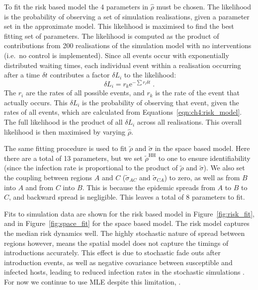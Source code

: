 To fit the risk based model the 4 parameters in $\hat{\rho}$ must be chosen. The likelihood is the probability of observing a set of simulation realisations, given a parameter set in the approximate model. This likelihood is maximised to find the best fitting set of parameters. The likelihood is computed as the product of contributions from 200 realisations of the simulation model with no interventions (i.e.\ no control is implemented). Since all events occur with exponentially distributed waiting times, each individual event within a realisation occurring after a time $\delta{}t$ contributes a factor $\delta{}L_i$ to the likelihood:
\begin{equation}
\delta{}L_i = r_k\mathrm{e}^{-\sum{}r_i\delta{}t}\;.
\end{equation}
The $r_i$ are the rates of all possible events, and $r_k$ is the rate of the event that actually occurs. This $\delta{}L_i$ is the probability of observing that event, given the rates of all events, which are calculated from Equations~\ref{eqn:ch4:risk_model}. The full likelihood is the product of all $\delta{}L_i$ across all realisations. This overall likelihood is then maximised by varying  $\hat{\rho}$.

The same fitting procedure is used to fit $\tilde{\rho}$ and $\tilde{\sigma}$ in the space based model. Here there are a total of 13 parameters, but we set $\tilde{\rho}^\mathrm{HH}$ to one to ensure identifiability (since the infection rate is proportional to the product of $\tilde{\rho}$ and $\tilde{\sigma}$). We also set the coupling between regions $A$ and $C$ ($\tilde{\sigma}_{AC}$ and $\tilde{\sigma}_{CA}$) to zero, as well as from $B$ into $A$ and from $C$ into $B$. This is because the epidemic spreads from $A$ to $B$ to $C$, and backward spread is negligible. This leaves a total of 8 parameters to fit.

Fits to simulation data are shown for the risk based model in Figure~\ref{fig:risk_fit}, and in Figure~\ref{fig:space_fit} for the space based model. The risk model captures the median risk dynamics well. The highly stochastic nature of spread between regions however, means the spatial model does not capture the timings of introductions accurately. This effect is due to stochastic fade outs after introduction events, as well as negative covariance between susceptible and infected hosts, leading to reduced infection rates in the stochastic simulations \citep[pp.~227--229 and pp.~238--240]{keeling_modeling_2008}. For now we continue to use MLE despite this limitation, .

